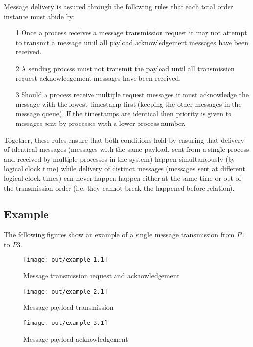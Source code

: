 \documentclass[twocolumn]{article}
\begin{document}
Message delivery is assured through the following rules that each total order
instance must abide by:

\begin{enumerate}
  \item[1]
    Once a process receives a message transmission request it may not
    attempt to transmit a message until all payload acknowledgement messages have
    been received.
  \item[2]
    A sending process must not transmit the payload until all transmission
    request acknowledgement messages have been received.
  \item[3]
    Should a process receive multiple request messages it must acknowledge the
    message with the lowest timestamp first (keeping the other messages in the
    message queue).
    If the timestamps are identical then priority is given to messages sent by
    processes with a lower process number.
\end{enumerate}

Together, these rules ensure that both conditions hold by ensuring that delivery
of identical messages (messages with the same payload, sent from a single
process and received by multiple processes in the system) happen simultaneously
(by logical clock time) while delivery of distinct messages (messages sent at
different logical clock times) can never happen happen either at the same time
or out of the transmission order (i.e. they cannot break the happened before
relation).

\subsection{Example}
\label{sec:example}

The following figures show an example of a single message transmission from $P1$
to $P3$.

\begin{figure}[h!]
  \centering
  \texttt{[image: out/example\_1.1]}
  \caption{Message transmission request and acknowledgement}
  \label{fig:example_1}
\end{figure}
\FloatBarrier

\begin{figure}[h!]
  \centering
  \texttt{[image: out/example\_2.1]}
  \caption{Message payload transmission}
  \label{fig:example_2}
\end{figure}
\FloatBarrier

\begin{figure}[h!]
  \centering
  \texttt{[image: out/example\_3.1]}
  \caption{Message payload acknowledgement}
  \label{fig:example_3}
\end{figure}
\FloatBarrier
\end{document}
